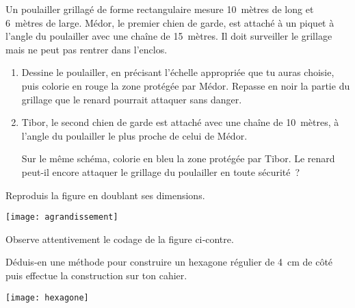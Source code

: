 \begin{exercice}
Un poulailler grillagé de forme rectangulaire mesure 10 mètres de long et 6 mètres de large. Médor, le premier chien de garde, est attaché à un piquet à l'angle du poulailler avec une chaîne de 15 mètres. Il doit surveiller le grillage mais ne peut pas rentrer dans l'enclos. 
\begin{enumerate}
 \item Dessine le poulailler, en précisant l'échelle appropriée que tu auras choisie, puis colorie en rouge la zone protégée par Médor. Repasse en noir la partie du grillage que le renard pourrait attaquer sans danger.
 \item Tibor, le second chien de garde est attaché avec une chaîne de 10 mètres, à l'angle du poulailler le plus proche de celui de Médor.
 
Sur le même schéma, colorie en bleu la zone protégée par Tibor. Le renard peut-il encore attaquer le grillage du poulailler en toute sécurité ?
 \end{enumerate}
\end{exercice}


\begin{exercice}[Agrandissement]
Reproduis la figure en doublant ses dimensions.
\begin{center} \texttt{[image: agrandissement]} \end{center}
\end{exercice}


\begin{exercice}

\vspace{1em}

\begin{minipage}[c]{0.50\linewidth}
Observe attentivement le codage de la figure ci‑contre. 

Déduis-en une méthode pour construire un hexagone régulier de 4 cm de côté puis effectue la construction sur ton cahier.
 \end{minipage} \hfill%
 \begin{minipage}[c]{0.46\linewidth}
  \begin{center} \texttt{[image: hexagone]} \end{center}
  \end{minipage} \\
\end{exercice}


